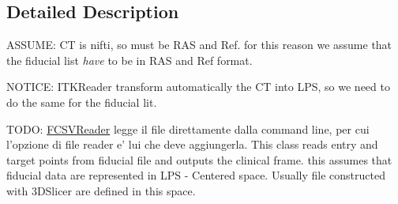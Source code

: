 \subsection{Detailed Description}
A\-S\-S\-U\-M\-E\-: C\-T is nifti, so must be R\-A\-S and Ref. for this reason we assume that the fiducial list {\itshape have} to be in R\-A\-S and Ref format.

N\-O\-T\-I\-C\-E\-: I\-T\-K\-Reader transform automatically the C\-T into L\-P\-S, so we need to do the same for the fiducial lit.

T\-O\-D\-O\-: \hyperlink{classFCSVReader}{F\-C\-S\-V\-Reader} legge il file direttamente dalla command line, per cui l'opzione di file reader e' lui che deve aggiungerla. This class reads entry and target points from fiducial file and outputs the clinical frame. this assumes that fiducial data are represented in L\-P\-S -\/ Centered space. Usually file constructed with 3\-D\-Slicer are defined in this space. 

